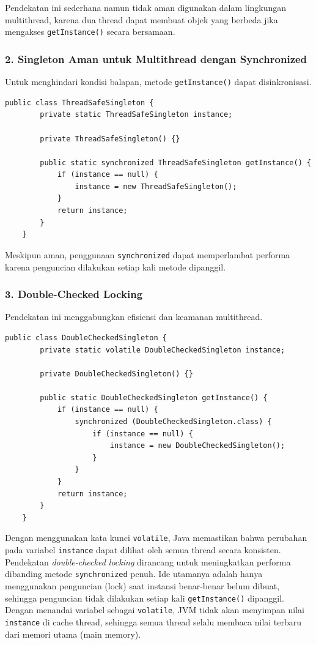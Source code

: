 Pendekatan ini sederhana namun tidak aman digunakan dalam lingkungan multithread, karena dua thread dapat membuat objek yang berbeda jika mengakses \texttt{getInstance()} secara bersamaan.

\subsubsection*{2. Singleton Aman untuk Multithread dengan Synchronized}

Untuk menghindari kondisi balapan, metode \texttt{getInstance()} dapat disinkronisasi.

\begin{lstlisting}[style=JavaStyle]
	public class ThreadSafeSingleton {
		private static ThreadSafeSingleton instance;
		
		private ThreadSafeSingleton() {}
		
		public static synchronized ThreadSafeSingleton getInstance() {
			if (instance == null) {
				instance = new ThreadSafeSingleton();
			}
			return instance;
		}
	}
\end{lstlisting}

Meskipun aman, penggunaan \texttt{synchronized} dapat memperlambat performa karena penguncian dilakukan setiap kali metode dipanggil.

\subsubsection*{3. Double-Checked Locking}

Pendekatan ini menggabungkan efisiensi dan keamanan multithread.

\begin{lstlisting}[style=JavaStyle]
	public class DoubleCheckedSingleton {
		private static volatile DoubleCheckedSingleton instance;
		
		private DoubleCheckedSingleton() {}
		
		public static DoubleCheckedSingleton getInstance() {
			if (instance == null) {
				synchronized (DoubleCheckedSingleton.class) {
					if (instance == null) {
						instance = new DoubleCheckedSingleton();
					}
				}
			}
			return instance;
		}
	}
\end{lstlisting}

Dengan menggunakan kata kunci \texttt{volatile}, Java memastikan bahwa perubahan pada variabel \texttt{instance} dapat dilihat oleh semua thread secara konsisten. Pendekatan \textit{double-checked locking} dirancang untuk meningkatkan performa dibanding metode \texttt{synchronized} penuh. Ide utamanya adalah hanya menggunakan penguncian (lock) saat instansi benar-benar belum dibuat, sehingga penguncian tidak dilakukan setiap kali \texttt{getInstance()} dipanggil. Dengan menandai variabel sebagai \texttt{volatile}, JVM tidak akan menyimpan nilai \texttt{instance} di cache thread, sehingga semua thread selalu membaca nilai terbaru dari memori utama (main memory).




